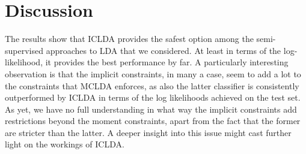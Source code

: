 \documentclass[10pt, a4paper, conference]{IEEEtran}
\begin{document}
%


\section{Discussion}
The results show that ICLDA provides the safest option among the semi-supervised approaches to LDA that we considered. At least in terms of the log-likelihood, it provides the best performance by far. A particularly interesting observation is that the implicit constraints, in many a case, seem to add a lot to the constraints that MCLDA enforces, as also the latter classifier is consistently outperformed by ICLDA in terms of the log likelihoods achieved on the test set. As yet, we have no full understanding in what way the implicit constraints add restrictions beyond the moment constraints, apart from the fact that the former are stricter than the latter.  A deeper insight into this issue might cast further light on the workings of ICLDA.
\end{document}
